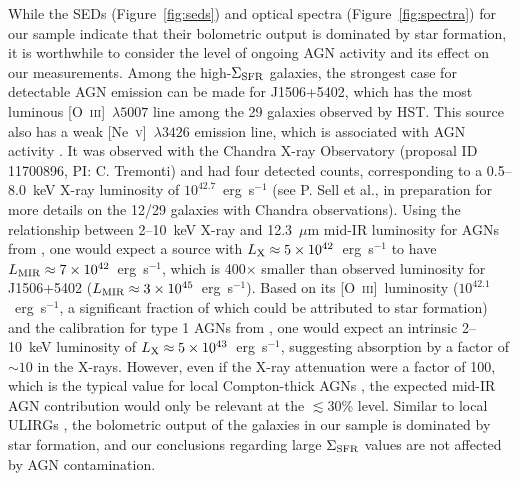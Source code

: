 \documentclass[apj]{emulateapj}
\newcommand{\nev}{[\textrm{Ne}~\textsc{v}]}
\newcommand{\oiii}{[\textrm{O}~\textsc{iii}]}
\newcommand{\sigmasfr}{\Sigma_{\textnormal{\scriptsize{SFR}}}}
\begin{document}
While the SEDs (Figure~\ref{fig:seds}) and optical spectra
(Figure~\ref{fig:spectra}) for our sample indicate that their
bolometric output is dominated by star formation, it is worthwhile to
consider the level of ongoing AGN activity and its effect on our
measurements.  Among the high-$\sigmasfr$ galaxies, the strongest case
for detectable AGN emission can be made for J1506+5402, which has the
most luminous \oiii~$\lambda5007$ line among the 29 galaxies observed
by HST.  This source also has a weak \nev~$\lambda3426$ emission line,
which is associated with AGN activity \citep[e.g.,][]{abe08,gil10}.
It was observed with the Chandra X-ray Observatory (proposal ID
11700896, PI: C. Tremonti) and had four detected counts, corresponding
to a 0.5--8.0~keV X-ray luminosity of $10^{42.7}$~erg~s$^{-1}$ (see
P. Sell et al., in preparation for more details on the 12/29 galaxies
with Chandra observations).  Using the relationship between 2--10~keV
X-ray and 12.3~$\mu$m mid-IR luminosity for AGNs from \citet{gan09},
one would expect a source with
$L_{\textnormal{\scriptsize{X}}}\approx5\times10^{42}$~erg~s$^{-1}$ to
have
$L_{\textnormal{\scriptsize{MIR}}}\approx7\times10^{42}$~erg~s$^{-1}$,
which is 400$\times$ smaller than observed luminosity for J1506+5402
($L_{\textnormal{\scriptsize{MIR}}}\approx3\times10^{45}$~erg~s$^{-1}$).
Based on its \oiii\ luminosity ($10^{42.1}$~erg~s$^{-1}$, a
significant fraction of which could be attributed to star formation)
and the calibration for type 1 AGNs from \citet{hec05}, one would
expect an intrinsic 2--10~keV luminosity of
$L_{\textnormal{\scriptsize{X}}}\approx5\times10^{43}$~erg~s$^{-1}$,
suggesting absorption by a factor of $\sim10$ in the X-rays.  However,
even if the X-ray attenuation were a factor of 100, which is the
typical value for local Compton-thick AGNs \citep{dia09}, the expected
mid-IR AGN contribution would only be relevant at the $\lesssim$30\%
level.  Similar to local ULIRGs \citep[e.g.,][]{far07}, the bolometric
output of the galaxies in our sample is dominated by star formation,
and our conclusions regarding large $\sigmasfr$ values are not
affected by AGN contamination.



\end{document}
